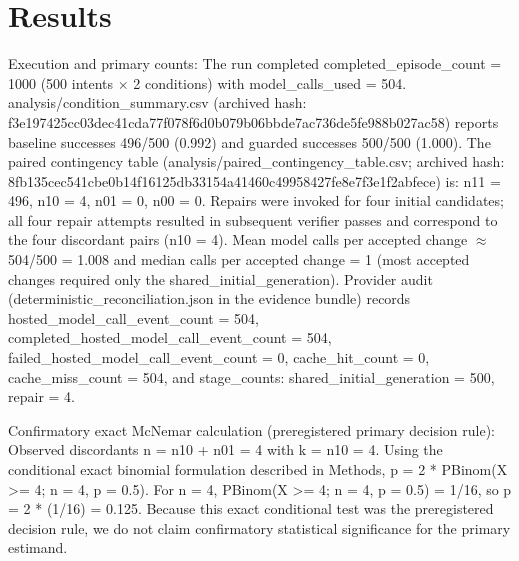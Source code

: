 \documentclass[conference]{IEEEtran}
\begin{document}
\section{Results}
Execution and primary counts: The run completed completed\_episode\_count = 1000 (500 intents \ensuremath{\times} 2 conditions) with model\_calls\_used = 504. analysis/condition\_summary.csv (archived hash: f3e19742\allowbreak{}5cc03dec\allowbreak{}41cda77f\allowbreak{}078f6d0b\allowbreak{}079b06bb\allowbreak{}de7ac736\allowbreak{}de5fe988\allowbreak{}b027ac58) reports baseline successes 496/500 (0.992) and guarded successes 500/500 (1.000). The paired contingency table (analysis/paired\_contingency\_table.csv; archived hash: 8fb135ce\allowbreak{}c541cbe0\allowbreak{}b14f1612\allowbreak{}5db33154\allowbreak{}a41460c4\allowbreak{}9958427f\allowbreak{}e8e7f3e1\allowbreak{}f2abfece) is: n11 = 496, n10 = 4, n01 = 0, n00 = 0. Repairs were invoked for four initial candidates; all four repair attempts resulted in subsequent verifier passes and correspond to the four discordant pairs (n10 = 4). Mean model calls per accepted change \ensuremath{\approx} 504/500 = 1.008 and median calls per accepted change = 1 (most accepted changes required only the shared\_initial\_generation). Provider audit (deterministic\_reconciliation.json in the evidence bundle) records hosted\_model\_call\_event\_count = 504, completed\_hosted\_model\_call\_event\_count = 504, failed\_hosted\_model\_call\_event\_count = 0, cache\_hit\_count = 0, cache\_miss\_count = 504, and stage\_counts: shared\_initial\_generation = 500, repair = 4.

Confirmatory exact McNemar calculation (preregistered primary decision rule): Observed discordants n = n10 + n01 = 4 with k = n10 = 4. Using the conditional exact binomial formulation described in Methods, p = 2 * PBinom(X >= 4; n = 4, p = 0.5). For n = 4, PBinom(X >= 4; n = 4, p = 0.5) = 1/16, so p = 2 * (1/16) = 0.125. Because this exact conditional test was the preregistered decision rule, we do not claim confirmatory statistical significance for the primary estimand.
\end{document}

